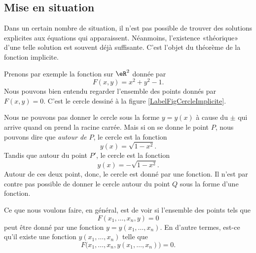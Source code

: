 \subsection{Mise en situation}

Dans un certain nombre de situation, il n'est pas possible de trouver des solutions explicites aux équations qui apparaissent. Néanmoins, l'existence «théorique» d'une telle solution est souvent déjà suffisante. C'est l'objet du théorème de la fonction implicite.

Prenons par exemple la fonction sur $\eR^2$ donnée par 
\begin{equation}
	F(x,y)=x^2+y^2-1.
\end{equation}
Nous pouvons bien entendu regarder l'ensemble des points donnés par $F(x,y)=0$. C'est le cercle dessiné à la figure \ref{LabelFigCercleImplicite}.
\newcommand{\CaptionFigCercleImplicite}{Un cercle pour montrer l'intérêt de la fonction implicite. Si on donne \( x\), nous ne pouvons pas savoir si nous parlons de \( P\) ou de \( P'\).}


%

Nous ne pouvons pas donner le cercle sous la forme $y=y(x)$ à cause du $\pm$ qui arrive quand on prend la racine carrée. Mais si on se donne le point $P$, nous pouvons dire que \emph{autour de $P$}, le cercle est la fonction
\begin{equation}
	y(x)=\sqrt{1-x^2}.
\end{equation}
Tandis que autour du point $P'$, le cercle est la fonction
\begin{equation}
	y(x)=-\sqrt{1-x^2}.
\end{equation}
Autour de ces deux point, donc, le cercle est donné par une fonction. Il n'est par contre pas possible de donner le cercle autour du point $Q$ sous la forme d'une fonction.

Ce que nous voulons faire, en général, est de voir si l'ensemble des points tels que
\begin{equation}
	F(x_1,\ldots,x_n,y)=0
\end{equation}
peut être donné par une fonction $y=y(x_1,\ldots,x_n)$. En d'autre termes, est-ce qu'il existe une fonction $y(x_1,\ldots,x_n)$ telle que
\begin{equation}
	F\big( x_1,\ldots,x_n,y(x_1,\ldots,x_n)\big)=0.
\end{equation}



